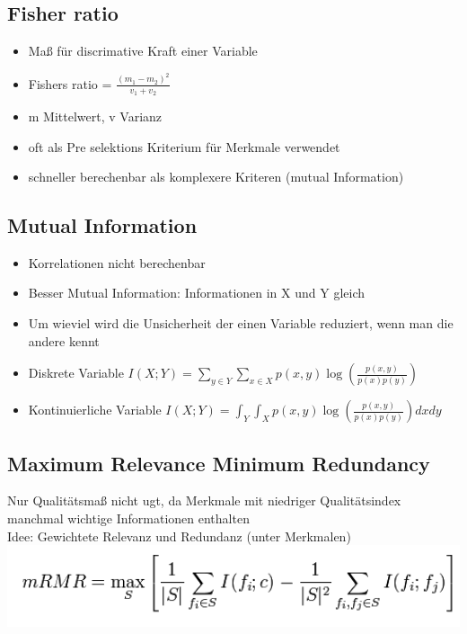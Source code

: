 \documentclass[a4paper,10pt,oneside]{article}
\begin{document}
\subsection{Fisher ratio}
\begin{itemize}
	\item Maß für discrimative Kraft einer Variable
	\item Fishers ratio = $\frac{(m_1-m_2)^2}{v_1+v_2}$
	\item m Mittelwert, v Varianz
	\item oft als Pre selektions Kriterium für Merkmale verwendet
	\item schneller berechenbar als komplexere Kriteren (mutual Information)
\end{itemize}

\subsection{Mutual Information}
\begin{itemize}
	\item Korrelationen nicht berechenbar
	\item Besser Mutual Information: Informationen in X und Y gleich
	\item Um wieviel wird die Unsicherheit der einen Variable reduziert, wenn man die andere kennt
	\item Diskrete Variable $I(X;Y) = \sum_{y\in Y} \sum_{x\in X} p(x,y) \log(\frac{p(x,y)}{p(x)p(y)})$
	\item Kontinuierliche Variable $I(X;Y) = \int_Y\int_Xp(x,y)\log(\frac{p(x,y)}{p(x)p(y)})dx dy$
\end{itemize}

\subsection{Maximum Relevance Minimum Redundancy}
Nur Qualitätsmaß nicht ugt, da Merkmale mit niedriger Qualitätsindex manchmal wichtige Informationen enthalten\\
Idee: Gewichtete Relevanz und Redundanz (unter Merkmalen)\\
\includegraphics[scale=0.65]{Grafiken/mrmr.png}
\end{document}

